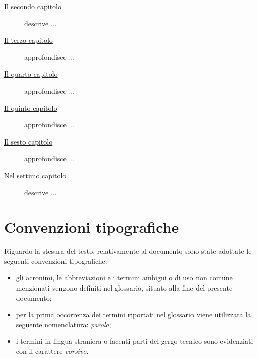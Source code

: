 \begin{description}
    \item[{\hyperref[cap:processi-metodologie]{Il secondo capitolo}}] descrive ...
    
    \item[{\hyperref[cap:descrizione-stage]{Il terzo capitolo}}] approfondisce ...
    
    \item[{\hyperref[cap:analisi-requisiti]{Il quarto capitolo}}] approfondisce ...
    
    \item[{\hyperref[cap:progettazione-codifica]{Il quinto capitolo}}] approfondisce ...
    
    \item[{\hyperref[cap:verifica-validazione]{Il sesto capitolo}}] approfondisce ...
    
    \item[{\hyperref[cap:conclusioni]{Nel settimo capitolo}}] descrive ...
\end{description}

\section{Convenzioni tipografiche}

Riguardo la stesura del testo, relativamente al documento sono state adottate le seguenti convenzioni tipografiche:
\begin{itemize}
	\item gli acronimi, le abbreviazioni e i termini ambigui o di uso non comune menzionati vengono definiti nel glossario, situato alla fine del presente documento;
	\item per la prima occorrenza dei termini riportati nel glossario viene utilizzata la seguente nomenclatura: \emph{parola}\glsfirstoccur;
	\item i termini in lingua straniera o facenti parti del gergo tecnico sono evidenziati con il carattere \emph{corsivo}.
\end{itemize}
